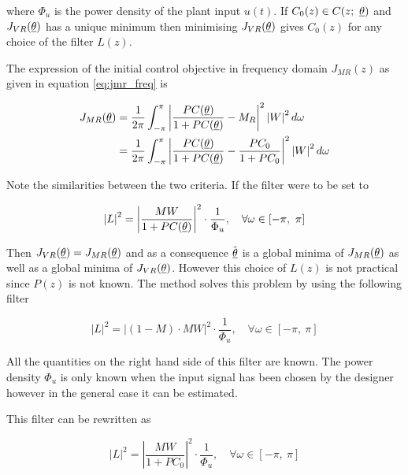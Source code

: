 \noindent
where \( \Phi_u \) is the power density of the plant input \( u(t) \). If \( C_0(z) \in C(z;\ \underline{\theta}) \) and \( J_{VR}(\underline{\theta}) \) has a unique minimum then minimising \( J_{VR}(\underline{\theta}) \) gives \( C_0(z) \) for any choice of the filter \( L(z) \).

The expression of the initial control objective in frequency domain \( J_{MR}(z) \) as given in equation \ref{eq:jmr_freq} is

\begin{equation}
    \begin{aligned}
        J_{MR}(\underline{\theta}) 
            &=  \frac{1}{2\pi} \int_{-\pi}^{\pi} \left| \frac{PC(\underline{\theta})}{1 + PC(\underline{\theta})} - M_R \right|^2 \left| W \right|^2 d\omega \\
            &=  \frac{1}{2\pi} \int_{-\pi}^{\pi} \left| \frac{PC(\underline{\theta})}{1 + PC(\underline{\theta})} - \frac{PC_0}{1 + PC_0} \right|^2 \left| W \right|^2 d\omega
    \end{aligned}
\end{equation}

\noindent
Note the similarities between the two criteria. If the filter were to be set to

\begin{equation}
    \left| L \right|^2 = \left| \frac{MW}{1 + PC(\underline{\theta})} \right|^2 \cdot \frac{1}{\Phi_u},\quad \forall \omega \in \left[ -\pi,\ \pi \right]
\end{equation}

\noindent
Then \( J_{VR}(\underline{\theta}) = J_{MR}(\underline{\theta}) \) and as a consequence \( \hat{\underline{\theta}} \) is a global minima of \( J_{MR}(\underline{\theta}) \) as well as a global minima of \( J_{VR}(\underline{\theta}) \). However this choice of \( L(z) \) is not practical since \( P(z) \) is not known. The method solves this problem by using the following filter

\begin{equation}
    \left| L \right|^2 = \left| \left(1 - M \right) \cdot MW \right|^2 \cdot \frac{1}{\Phi_u},\quad \forall \omega \in \left[ -\pi,\ \pi \right]
\end{equation}

\noindent
All the quantities on the right hand side of this filter are known. The power density \( \Phi_u \) is only known when the input signal has been chosen by the designer however in the general case it can be estimated.

This filter can be rewritten as

\begin{equation}
    \left| L \right|^2 = \left| \frac{MW}{1 + PC_0} \right|^2 \cdot \frac{1}{\Phi_u},\quad \forall \omega \in \left[ -\pi,\ \pi \right]    
\end{equation}

